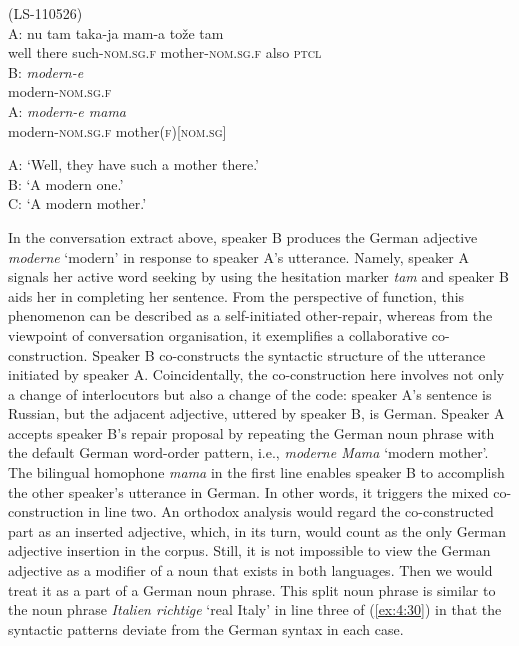 \ea
\label{ex:4:34}
(LS-110526) \\
 \gll A: nu tam taka-ja mam-a tože tam \\
	{} well there such-\textsc{nom.sg.f} mother-\textsc{nom.sg.f} also \textsc{ptcl} \\
\glt 
 \gll B: \textit{modern-e} \\
	{} modern-\textsc{nom.sg.f} \\
\glt 
 \gll A: \textit{modern-e mama} \\
	{} modern-\textsc{nom.sg.f} mother(\textsc{f})[\textsc{nom.sg}] \\
\glt 

A: `Well, they have such a mother there.'\\
B: `A modern one.'\\
C: `A modern mother.'\\
\z

\begin{sloppypar}
\noindent In the conversation extract above, speaker B produces the German adjective \textit{moderne} `modern' in response to speaker A's utterance. Namely, speaker A signals her active word seeking by using the hesitation marker \textit{tam} and speaker B aids her in completing her sentence. From the perspective of function, this phenomenon can be described as a self-initiated other-repair, whereas from the viewpoint of conversation organisation, it exemplifies a collaborative co-construction. Speaker B co-constructs the syntactic structure of the utterance initiated by speaker A. Coincidentally, the co-construction here involves not only a change of interlocutors but also a change of the code: speaker A's sentence is Russian, but the adjacent adjective, uttered by speaker B, is German. Speaker A accepts speaker B's repair proposal by repeating the German noun phrase with the default German word-order pattern, i.e., \textit{moderne Mama} `modern mother'. The bilingual homophone \textit{mama} in the first line enables speaker B to accomplish the other speaker's utterance in German. In other words, it triggers the mixed co-construction in line two. An orthodox analysis would regard the co-constructed part as an inserted adjective, which, in its turn, would count as the only German adjective insertion in the corpus. Still, it is not impossible to view the German adjective as a modifier of a noun that exists in both languages. Then we would treat it as a part of a German noun phrase. This split noun phrase is similar to the noun phrase \textit{Italien richtige} `real Italy' in line three of (\ref{ex:4:30}) in that the syntactic patterns deviate from the German syntax in each case.
\end{sloppypar}

